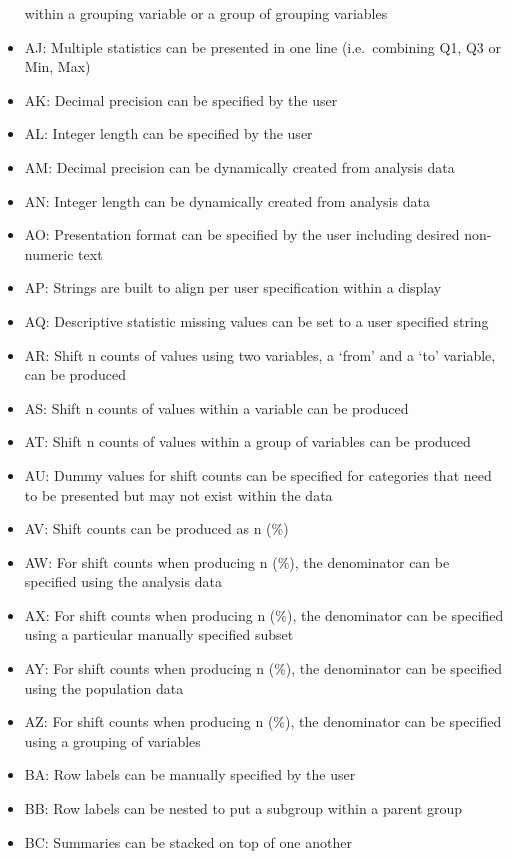 \documentclass[
]{article}
\begin{document}
\begin{itemize}
  within a grouping variable or a group of grouping variables
\item
  AJ: Multiple statistics can be presented in one line (i.e.~combining
  Q1, Q3 or Min, Max)
\item
  AK: Decimal precision can be specified by the user
\item
  AL: Integer length can be specified by the user
\item
  AM: Decimal precision can be dynamically created from analysis data
\item
  AN: Integer length can be dynamically created from analysis data
\item
  AO: Presentation format can be specified by the user including desired
  non-numeric text
\item
  AP: Strings are built to align per user specification within a display
\item
  AQ: Descriptive statistic missing values can be set to a user
  specified string
\item
  AR: Shift n counts of values using two variables, a `from' and a `to'
  variable, can be produced
\item
  AS: Shift n counts of values within a variable can be produced
\item
  AT: Shift n counts of values within a group of variables can be
  produced
\item
  AU: Dummy values for shift counts can be specified for categories that
  need to be presented but may not exist within the data
\item
  AV: Shift counts can be produced as n (\%)
\item
  AW: For shift counts when producing n (\%), the denominator can be
  specified using the analysis data
\item
  AX: For shift counts when producing n (\%), the denominator can be
  specified using a particular manually specified subset
\item
  AY: For shift counts when producing n (\%), the denominator can be
  specified using the population data
\item
  AZ: For shift counts when producing n (\%), the denominator can be
  specified using a grouping of variables
\item
  BA: Row labels can be manually specified by the user
\item
  BB: Row labels can be nested to put a subgroup within a parent group
\item
  BC: Summaries can be stacked on top of one another

\end{itemize}
\end{document}
